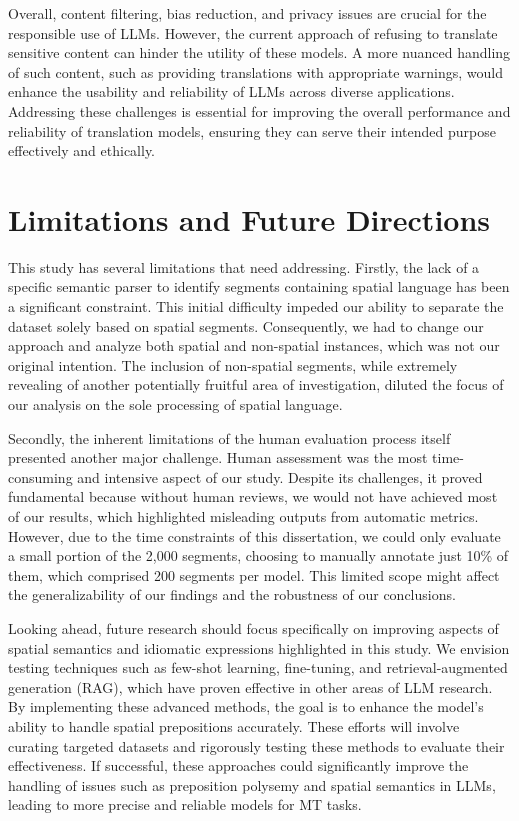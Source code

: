 Overall, content filtering, bias reduction, and privacy issues are crucial for the responsible use of LLMs. However, the current approach of refusing to translate sensitive content can hinder the utility of these models. A more nuanced handling of such content, such as providing translations with appropriate warnings, would enhance the usability and reliability of LLMs across diverse applications. Addressing these challenges is essential for improving the overall performance and reliability of translation models, ensuring they can serve their intended purpose effectively and ethically.


\section{Limitations and Future Directions}

This study has several limitations that need addressing. Firstly, the lack of a specific semantic parser to identify segments containing spatial language has been a significant constraint. This initial difficulty impeded our ability to separate the dataset solely based on spatial segments. Consequently, we had to change our approach and analyze both spatial and non-spatial instances, which was not our original intention. The inclusion of non-spatial segments, while extremely revealing of another potentially fruitful area of investigation, diluted the focus of our analysis on the sole processing of spatial language.

Secondly, the inherent limitations of the human evaluation process itself presented another major challenge. Human assessment was the most time-consuming and intensive aspect of our study. Despite its challenges, it proved fundamental because without human reviews, we would not have achieved most of our results, which highlighted misleading outputs from automatic metrics. However, due to the time constraints of this dissertation, we could only evaluate a small portion of the 2,000 segments, choosing to manually annotate just 10\% of them, which comprised 200 segments per model. This limited scope might affect the generalizability of our findings and the robustness of our conclusions.

Looking ahead, future research should focus specifically on improving aspects of spatial semantics and idiomatic expressions highlighted in this study. We envision testing techniques such as few-shot learning, fine-tuning, and retrieval-augmented generation (RAG), which have proven effective in other areas of LLM research. By implementing these advanced methods, the goal is to enhance the model’s ability to handle spatial prepositions accurately. These efforts %
will involve curating targeted datasets and rigorously testing these methods to evaluate their effectiveness. If successful, these approaches could significantly improve the handling of issues such as preposition polysemy and spatial semantics in LLMs, leading to more precise and reliable models for MT tasks.

